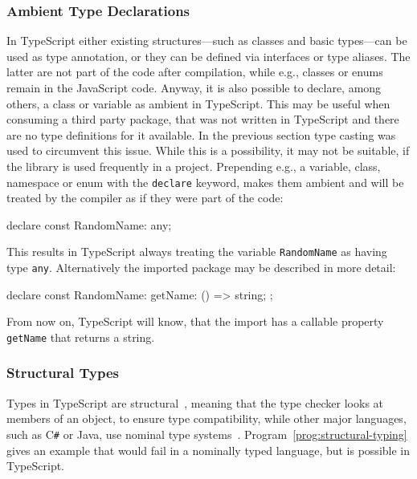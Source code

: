 \subsubsection{Ambient Type Declarations}
\label{sec:ts-ambient-type-declarations}

In TypeScript either existing structures---such as classes and basic types---can be used as type annotation, or they can be defined via interfaces or type aliases. The latter are not part of the code after compilation, while e.g., classes or enums remain in the JavaScript code. Anyway, it is also possible to declare, among others, a class or variable as ambient in TypeScript. This may be useful when consuming a third party package, that was not written in TypeScript and there are no type definitions for it available. In the previous section type casting was used to circumvent this issue. While this is a possibility, it may not be suitable, if the library is used frequently in a project. Prepending e.g., a variable, class, namespace or enum with the \texttt{declare} keyword, makes them ambient and will be treated by the compiler as if they were part of the code:
\begin{JsCode}[numbers=none]
declare const RandomName: any;
\end{JsCode}
This results in TypeScript always treating the variable \texttt{RandomName} as having type \texttt{any}. Alternatively the imported package may be described in more detail:
\begin{JsCode}[numbers=none]
declare const RandomName: {
  getName: () => string;
};
\end{JsCode}
From now on, TypeScript will know, that the import has a callable property \texttt{getName} that returns a string.

\subsubsection{Structural Types}
\label{sec:ts-structural-types}

Types in TypeScript are structural~\cite[p.~11]{TypeScriptBook:Syed:2017}, meaning that the type checker looks at members of an object, to ensure type compatibility, while other major languages, such as C\texttt{\#} or Java, use nominal type systems~\cite{TypeScriptHandbook:TypeCompatibility}. Program~\ref{prog:structural-typing} gives an example that would fail in a nominally typed language, but is possible in TypeScript.


